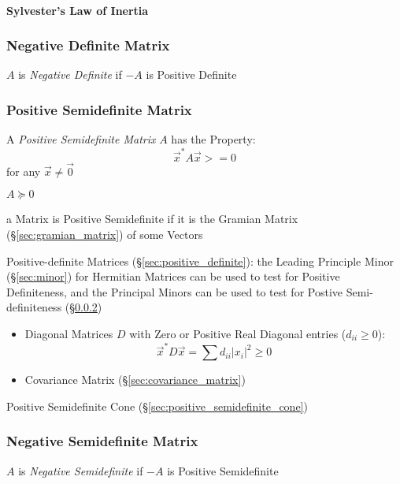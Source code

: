 \paragraph{Sylvester's Law of Inertia}\label{sec:sylversters_law}\hfill



\subsubsection{Negative Definite Matrix}\label{sec:negative_definite}

$A$ is \emph{Negative Definite} if $-A$ is Positive Definite



\subsubsection{Positive Semidefinite Matrix}\label{sec:positive_semidefinite}

A \emph{Positive Semidefinite Matrix} $A$ has the Property:
\[
  \vec{x}^* A \vec{x} >= 0
\]
for any $\vec{x} \neq \vec{0}$

$A \succeq 0$

a Matrix is Positive Semidefinite if it is the Gramian Matrix
(\S\ref{sec:gramian_matrix}) of some Vectors

Positive-definite Matrices (\S\ref{sec:positive_definite}): the Leading
Principle Minor (\S\ref{sec:minor}) for Hermitian Matrices can be used to test
for Positive Definiteness, and the Principal Minors can be used to test for
Postive Semi-definiteness (\S\ref{sec:positive_semidefinite})

\begin{itemize}
  \item Diagonal Matrices $D$ with Zero or Positive Real Diagonal entries
    ($d_{ii} \geq 0$):
    \[
      \vec{x}^*D\vec{x} = \sum d_{ii}|x_i|^2 \geq 0
    \]
  \item Covariance Matrix (\S\ref{sec:covariance_matrix})
\end{itemize}

\fist Positive Semidefinite Cone (\S\ref{sec:positive_semidefinite_cone})



\subsubsection{Negative Semidefinite Matrix}\label{sec:negative_semidefinite}

$A$ is \emph{Negative Semidefinite} if $-A$ is Positive Semidefinite



